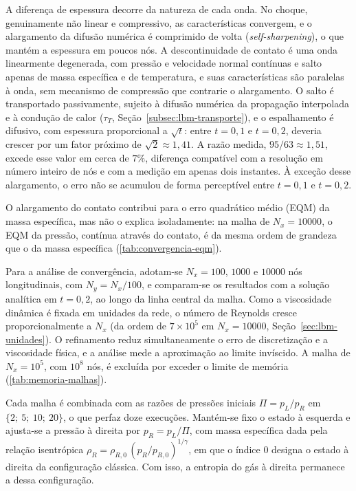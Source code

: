 A diferença de espessura decorre da natureza de cada onda.
No choque, genuinamente não linear e compressivo, as características convergem, e o alargamento da difusão numérica é comprimido de volta (\textit{self-sharpening}), o que mantém a espessura em poucos nós.
A descontinuidade de contato é uma onda linearmente degenerada, com pressão e velocidade normal contínuas e salto apenas de massa específica e de temperatura, e suas características são paralelas à onda, sem mecanismo de compressão que contrarie o alargamento.
O salto é transportado passivamente, sujeito à difusão numérica da propagação interpolada e à condução de calor (\(\tau_T\), Seção~\ref{subsec:lbm-transporte}), e o espalhamento é difusivo, com espessura proporcional a \(\sqrt{t}\): entre \(t=0{,}1\) e \(t=0{,}2\), deveria crescer por um fator próximo de \(\sqrt{2}\approx1{,}41\).
A razão medida, \(95/63\approx1{,}51\), excede esse valor em cerca de \(7\%\), diferença compatível com a resolução em número inteiro de nós e com a medição em apenas dois instantes.
À exceção desse alargamento, o erro não se acumulou de forma perceptível entre \(t=0{,}1\) e \(t=0{,}2\).

O alargamento do contato contribui para o erro quadrático médio (EQM) da massa específica, mas não o explica isoladamente: na malha de \(N_x = 10000\), o EQM da pressão, contínua através do contato, é da mesma ordem de grandeza que o da massa específica (\autoref{tab:convergencia-eqm}).

Para a análise de convergência, adotam-se \(N_x = 100\), \(1000\) e \(10000\) nós longitudinais, com \(N_y = N_x/100\), e comparam-se os resultados com a solução analítica em \(t = 0{,}2\), ao longo da linha central da malha.
Como a viscosidade dinâmica é fixada em unidades da rede, o número de Reynolds cresce proporcionalmente a \(N_x\) (da ordem de \(7 \times 10^{5}\) em \(N_x = 10000\), Seção~\ref{sec:lbm-unidades}).
O refinamento reduz simultaneamente o erro de discretização e a viscosidade física, e a análise mede a aproximação ao limite invíscido.
A malha de \(N_x = 10^5\), com \(10^8\) nós, é excluída por exceder o limite de memória (\autoref{tab:memoria-malhas}).

Cada malha é combinada com as razões de pressões iniciais \(\Pi = p_L/p_R\) em \(\{2;\ 5;\ 10;\ 20\}\), o que perfaz doze execuções.
Mantém-se fixo o estado à esquerda e ajusta-se a pressão à direita por \(p_R = p_L/\Pi\), com massa específica dada pela relação isentrópica \(\rho_R = \rho_{R,0}\,(p_R/p_{R,0})^{1/\gamma}\), em que o índice 0 designa o estado à direita da configuração clássica.
Com isso, a entropia do gás à direita permanece a dessa configuração.

